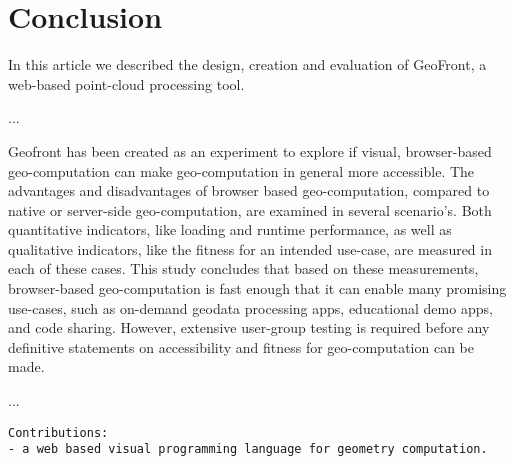 \chapter{Conclusion}
\label{chap:conclusion}

In this article we described the design, creation and evaluation of GeoFront, a web-based point-cloud processing tool.

...

Geofront has been created as an experiment to explore if visual, 
browser-based geo-computation can make geo-computation in general more accessible. 
The advantages and disadvantages of browser based geo-computation, compared to native or server-side geo-computation, are examined in several scenario's. 
Both quantitative indicators, like loading and runtime performance, as well as qualitative indicators, like the fitness for an intended use-case, are measured in each of these cases.
This study concludes that based on these measurements, browser-based geo-computation  is fast enough that it can enable many promising use-cases, such as on-demand geodata processing apps, educational demo apps, and code sharing. However, extensive user-group testing is required before any definitive statements on accessibility and fitness for geo-computation can be made.  

...

\begin{lstlisting}
Contributions: 
- a web based visual programming language for geometry computation.  

\end{lstlisting}









